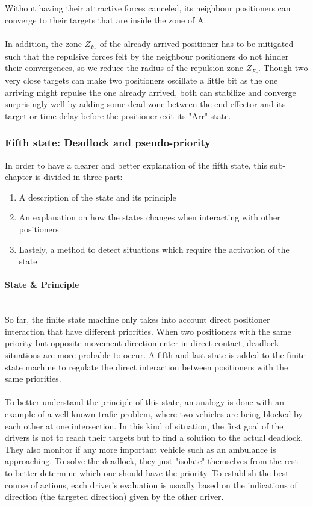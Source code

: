 \documentclass[]{spie}  %
\begin{document}
	Without having their attractive forces canceled, its neighbour positioners can converge to their targets that are inside the zone of A.\\\\
	In addition, the zone $Z_{F_{r}}$ of the already-arrived positioner has to be mitigated such that the repulsive forces felt by the neighbour positioners do not hinder their convergences, so we reduce the radius of the repulsion zone $Z_{F_{r}}$. Though two very close targets can make two positioners oscillate a little bit as the one arriving might repulse the one already arrived, both can stabilize and converge surprisingly well by adding some dead-zone between the end-effector and its target or time delay before the positioner exit its "Arr" state.  
	
	\subsubsection{Fifth state: Deadlock and pseudo-priority}
	\label{sub_chapter_fifth_state}
	In order to have a clearer and better explanation of the fifth state, this sub-chapter is divided in three part: 
	\begin{enumerate}
		\item A description of the state and its principle 
		\item An explanation on how the states changes when interacting with other positioners
		\item Lastely, a method to detect situations which require the activation of the state
	\end{enumerate}
	
	\paragraph{State \& Principle}\mbox{}\\
	So far, the finite state machine only takes into account direct positioner interaction that have different priorities.
	When two positioners with the same priority but opposite movement direction enter in direct contact, deadlock situations are more probable to occur. A fifth and last state is added to the finite state machine to regulate the direct interaction between positioners with the same priorities.\\\\	
	To better understand the principle of this state, an analogy is done with an example of a well-known trafic problem, where two vehicles are being blocked by each other at one intersection. 
	In this kind of situation, the first goal of the drivers is not to reach their targets but to find a solution to the actual deadlock. They also monitor if any more important vehicle such as an ambulance is approaching. To solve the deadlock, they just "isolate" themselves from the rest to better determine which one should have the priority. To establish the best course of actions, each driver's evaluation is usually based on the indications of direction (the targeted direction) given by the other driver.\\
	
\end{document}
